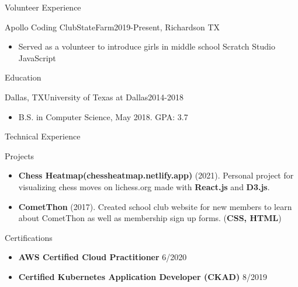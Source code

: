 \documentclass[]{lau}
\begin{document}
	\begin{cvsection}{Volunteer Experience}
		\begin{cvsubsection}{Apollo Coding Club}{StateFarm}{2019-Present, Richardson TX}
			\begin{itemize}
				\item Served as a volunteer to introduce girls in middle school Scratch Studio JavaScript
			\end{itemize}
		\end{cvsubsection}
	\end{cvsection}

	\begin{cvsection}{Education}
		\begin{cvsubsection}{Dallas, TX}{University of Texas at Dallas}{2014-2018}
			\begin{itemize}
				\item B.S. in Computer Science, May 2018. GPA: 3.7
			\end{itemize}
		\end{cvsubsection}
	\end{cvsection}

	\begin{cvsection}{Technical Experience}
		\begin{cvsubsection}{Projects}{}{}
			\begin{itemize}
				\item \textbf{Chess Heatmap(chessheatmap.netlify.app)} (2021). Personal project for visualizing chess moves on lichess.org made with \textbf{React.js} and \textbf{D3.js}.
				\item \textbf{CometThon} (2017). Created school club website for new members to learn about CometThon as well as membership sign up forms. (\textbf{CSS, HTML})
			\end{itemize}
		\end{cvsubsection}
	\end{cvsection}

	\begin{cvsection}{Certifications}
		\begin{cvsubsection}{}{}{}
			\begin{itemize}
				\item \textbf{AWS Certified Cloud Practitioner} 6/2020
				\item \textbf{Certified Kubernetes Application Developer (CKAD)} 8/2019
			\end{itemize}
		\end{cvsubsection}
	\end{cvsection}
\end{document}
